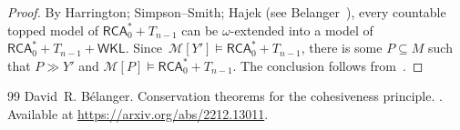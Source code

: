 \documentclass{article}
\numberwithin{theorem}{section}
\newcommand{\RCA}{\mathsf{RCA}}
\newcommand{\WKL}{\mathsf{WKL}}
\newcommand{\M}{\mathcal{M}}
\begin{document}
\begin{proof}
By Harrington; Simpson–Smith; Hajek (see Belanger~\cite{Blanger2022ConservationTF}), every countable topped model of $\RCA_0^* + T_{n-1}$ can be $\omega$-extended into a model of~$\RCA_0^* + T_{n-1} + \WKL$. Since~$\M[Y'] \models \RCA_0^* + T_{n-1}$, there is some $P \subseteq M$ such that $P \gg Y'$ and $\M[P] \models \RCA_0^* + T_{n-1}$.
The conclusion follows from~.    
\end{proof}

\begin{thebibliography}{99}
David~R. B{\'e}langer.
\newblock Conservation theorems for the cohesiveness principle.
.
\newblock Available at \url{https://arxiv.org/abs/2212.13011}.
\end{thebibliography}
\end{document}
